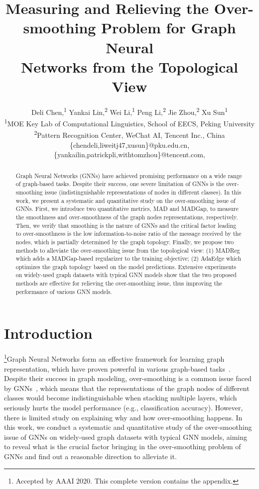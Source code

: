 \documentclass[letterpaper]{article} \usepackage{aaai20}  \usepackage{times}  \usepackage{helvet} \usepackage{courier}  \usepackage[hyphens]{url}  \usepackage{graphicx} \urlstyle{rm} \def\UrlFont{\rm}  \frenchspacing  \setlength{\pdfpagewidth}{8.5in}  \setlength{\pdfpageheight}{11in}  \setcounter{secnumdepth}{0}
\title{Measuring and Relieving the Over-smoothing Problem for Graph Neural \\ Networks from the Topological View}
\author{Deli Chen,\textsuperscript{\rm 1}
Yankai Lin,\textsuperscript{\rm 2}
Wei Li,\textsuperscript{\rm 1}
Peng Li,\textsuperscript{\rm 2}
Jie Zhou,\textsuperscript{\rm 2}
Xu Sun\textsuperscript{\rm 1}
\\ 
\textsuperscript{\rm 1}{MOE Key Lab of Computational Linguistics, School of EECS, Peking University}\\
\textsuperscript{\rm 2}{Pattern Recognition Center, WeChat AI, Tencent Inc., China}\\
\{chendeli,liweitj47,xusun\}@pku.edu.cn,
\{yankailin,patrickpli,withtomzhou\}@tencent.com, 
}
\newcommand{\citep}{\cite}
\begin{document}
\maketitle
\begin{abstract}
Graph Neural Networks (GNNs) have achieved promising performance on a wide range of graph-based tasks. Despite their success, one severe limitation of GNNs is the over-smoothing issue (indistinguishable representations of nodes in different classes). In this work, we present a systematic and quantitative study on the over-smoothing issue of GNNs. 
First, we introduce two quantitative metrics, MAD and MADGap, to measure the smoothness and over-smoothness of the graph nodes representations, respectively.
Then, we verify that smoothing is the nature of GNNs and the critical factor leading to over-smoothness is the low information-to-noise ratio of the message received by the nodes, which is partially determined by the graph topology.
Finally, we propose two methods to alleviate the over-smoothing issue from the topological view: 
(1) MADReg which adds a MADGap-based regularizer to the training objective;
(2) AdaEdge which optimizes the graph topology based on the model predictions.
Extensive experiments on  widely-used graph datasets with  typical GNN models show that the two proposed methods are effective for relieving the over-smoothing issue, thus improving the performance of various GNN models. 
\end{abstract}

\section{Introduction}
\footnote{Accepted by AAAI 2020. This complete version contains the appendix.}Graph Neural Networks form an effective framework for learning graph representation, which have proven powerful in various graph-based tasks~\citep{dataset_ccp,model_gat,dataset_ppi}. Despite their success in graph modeling, over-smoothing is a common issue faced by GNNs~\citep{analysis_smoothing,survey_gnn}, which means that the representations of the graph nodes of different classes would become indistinguishable when stacking multiple layers, which seriously hurts the model performance (e.g., classification accuracy). However, there is limited study on explaining why and how over-smoothing happens.
In this work, we conduct a systematic and quantitative study of the over-smoothing issue of GNNs on  widely-used graph datasets with  typical GNN models, aiming to reveal what is the crucial factor bringing in the over-smoothing problem of GNNs and find out a reasonable direction to alleviate it. 
\end{document}
